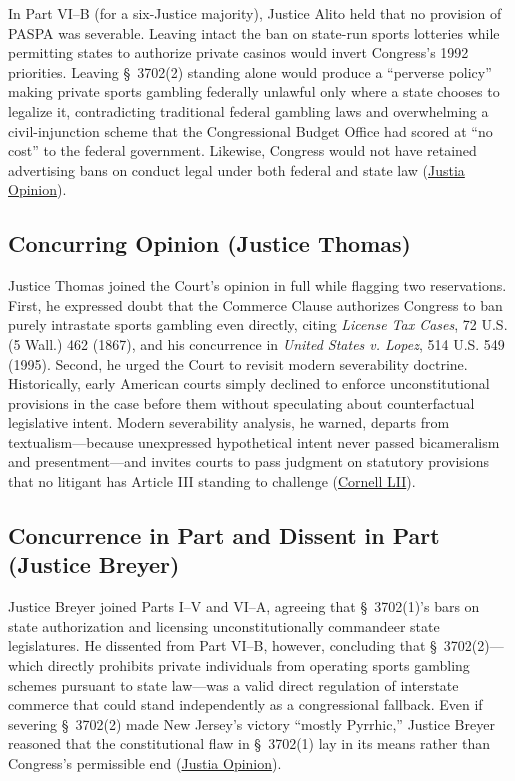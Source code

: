 \documentclass[12pt]{article}
\begin{document}
In Part VI--B (for a six-Justice majority), Justice Alito held that no provision of PASPA was severable. Leaving intact the ban on state-run sports lotteries while permitting states to authorize private casinos would invert Congress's 1992 priorities. Leaving \S~3702(2) standing alone would produce a ``perverse policy'' making private sports gambling federally unlawful only where a state chooses to legalize it, contradicting traditional federal gambling laws and overwhelming a civil-injunction scheme that the Congressional Budget Office had scored at ``no cost'' to the federal government. Likewise, Congress would not have retained advertising bans on conduct legal under both federal and state law (\href{https://supreme.justia.com/cases/federal/us/584/16-476/}{Justia Opinion}).

\subsection{Concurring Opinion (Justice Thomas)}

Justice Thomas joined the Court's opinion in full while flagging two reservations. First, he expressed doubt that the Commerce Clause authorizes Congress to ban purely intrastate sports gambling even directly, citing \textit{License Tax Cases}, 72 U.S. (5 Wall.) 462 (1867), and his concurrence in \textit{United States v. Lopez}, 514 U.S. 549 (1995). Second, he urged the Court to revisit modern severability doctrine. Historically, early American courts simply declined to enforce unconstitutional provisions in the case before them without speculating about counterfactual legislative intent. Modern severability analysis, he warned, departs from textualism---because unexpressed hypothetical intent never passed bicameralism and presentment---and invites courts to pass judgment on statutory provisions that no litigant has Article III standing to challenge (\href{https://www.law.cornell.edu/supremecourt/text/16-476}{Cornell LII}).

\subsection{Concurrence in Part and Dissent in Part (Justice Breyer)}

Justice Breyer joined Parts I--V and VI--A, agreeing that \S~3702(1)'s bars on state authorization and licensing unconstitutionally commandeer state legislatures. He dissented from Part VI--B, however, concluding that \S~3702(2)---which directly prohibits private individuals from operating sports gambling schemes pursuant to state law---was a valid direct regulation of interstate commerce that could stand independently as a congressional fallback. Even if severing \S~3702(2) made New Jersey's victory ``mostly Pyrrhic,'' Justice Breyer reasoned that the constitutional flaw in \S~3702(1) lay in its means rather than Congress's permissible end (\href{https://supreme.justia.com/cases/federal/us/584/16-476/}{Justia Opinion}).
\end{document}
